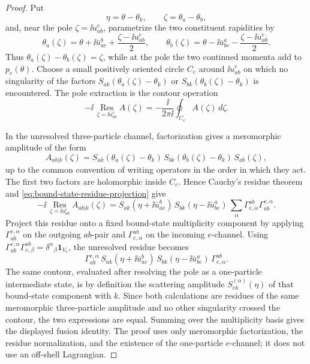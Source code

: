 \begin{proof}
Put
\[
  \eta=\theta-\theta_k,\qquad
  \zeta=\theta_a-\theta_b,
\]
and, near the pole \(\zeta=\ii u_{ab}^{e}\), parametrize the two constituent
rapidities by
\[
  \theta_a(\zeta)
  =
  \theta+\ii\bar u_{ae}^{b}
  +\frac{\zeta-\ii u_{ab}^{e}}{2},
  \qquad
  \theta_b(\zeta)
  =
  \theta-\ii\bar u_{be}^{a}
  -\frac{\zeta-\ii u_{ab}^{e}}{2}.
\]
Thus \(\theta_a(\zeta)-\theta_b(\zeta)=\zeta\), while at the pole the two
continued momenta add to \(p_e(\theta)\).  Choose a small positively oriented
circle \(C_e\) around \(\ii u_{ab}^{e}\) on which no singularity of the
factors \(S_{ak}(\theta_a(\zeta)-\theta_k)\) or
\(S_{bk}(\theta_b(\zeta)-\theta_k)\) is encountered.  The pole extraction is
the contour operation
\[
  -\ii\,\operatorname*{Res}_{\zeta=\ii u_{ab}^{e}}A(\zeta)
  =
  -\frac{\ii}{2\pi\ii}\oint_{C_e}A(\zeta)\,d\zeta .
\]

In the unresolved three-particle channel, factorization gives a meromorphic
amplitude of the form
\[
  A_{ab|k}(\zeta)
  =
  S_{ak}(\theta_a(\zeta)-\theta_k)\,
  S_{bk}(\theta_b(\zeta)-\theta_k)\,
  S_{ab}(\zeta),
\]
up to the common convention of writing operators in the order in which they
act.  The first two factors are holomorphic inside \(C_e\).  Hence Cauchy's
residue theorem and \eqref{eq:bound-state-residue-projection} give
\[
  -\ii\,\operatorname*{Res}_{\zeta=\ii u_{ab}^{e}}A_{ab|k}(\zeta)
  =
  S_{ak}(\eta+\ii\bar u_{ae}^{b})\,
  S_{bk}(\eta-\ii\bar u_{be}^{a})\,
  \sum_\alpha
  \Gamma_{e,\alpha}^{ab}\Gamma_{ab}^{e,\alpha}.
\]
Project this residue onto a fixed bound-state multiplicity component by
applying \(\Gamma_{ab}^{e,\alpha}\) on the outgoing \(ab\)-pair and
\(\Gamma_{e,\alpha}^{ab}\) on the incoming \(e\)-channel.  Using
\(\Gamma_{ab}^{e,\alpha}\Gamma_{e,\beta}^{ab}
=\delta^\alpha{}_\beta\mathbf 1_{V_e}\), the unresolved residue becomes
\[
  \Gamma_{ab}^{e,\alpha}\,
  S_{ak}(\eta+\ii\bar u_{ae}^{b})\,
  S_{bk}(\eta-\ii\bar u_{be}^{a})\,
  \Gamma_{e,\alpha}^{ab}.
\]
The same contour, evaluated after resolving the pole as a one-particle
intermediate state, is by definition the scattering amplitude
\(S_{ek}^{(\alpha)}(\eta)\) of that bound-state component with \(k\).  Since
both calculations are residues of the same meromorphic three-particle
amplitude and no other singularity crossed the contour, the two expressions
are equal.  Summing over the multiplicity basis gives the displayed fusion
identity.  The proof uses only meromorphic factorization, the residue
normalization, and the existence of the one-particle \(e\)-channel; it does
not use an off-shell Lagrangian.
\end{proof}

